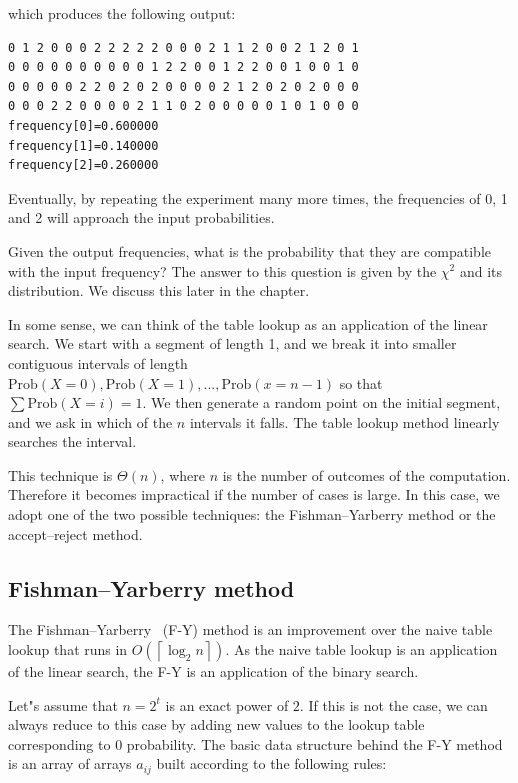 \documentclass[justified, sixbynine]{tufte-book}
\theoremstyle{plain}%
\newtheorem * {corollary}{Corollary}
\theoremstyle{definition}
\theoremstyle{remark}
\newtheorem * {remark}{Remark}
\newtheorem * {note}{Note}
\begin{document}
\begin{fullwidth}
which produces the following output:

\begin{lstlisting}
0 1 2 0 0 0 2 2 2 2 2 0 0 0 2 1 1 2 0 0 2 1 2 0 1
0 0 0 0 0 0 0 0 0 0 1 2 2 0 0 1 2 2 0 0 1 0 0 1 0
0 0 0 0 0 2 2 0 2 0 2 0 0 0 0 2 1 2 0 2 0 2 0 0 0
0 0 0 2 2 0 0 0 0 2 1 1 0 2 0 0 0 0 0 1 0 1 0 0 0
frequency[0]=0.600000
frequency[1]=0.140000
frequency[2]=0.260000
\end{lstlisting}

Eventually, by repeating the experiment many more times, the frequencies of
0, 1 and 2 will approach the input probabilities.

Given the output frequencies, what is the probability that they are compatible with the input frequency?
The answer to this question is given by the $\chi^2$ and its distribution. We discuss this later in the chapter.

In some sense, we can think of the table lookup as an application of the
linear search. We start with a segment of length 1, and we break it into smaller
contiguous intervals of length $\textrm{Prob}(X=0), \textrm{Prob}(X=1), ..., \textrm{Prob}(x=n-1)$ so that $\sum
\textrm{Prob}(X=i)=1.$ We then generate a random point on the initial segment, and we ask
in which of the $n$ intervals it falls. The table lookup method linearly
searches the interval.

This technique is $\Theta (n)$, where $n$ is the number of outcomes of the
computation. Therefore it becomes impractical if the number of cases is
large. In this case, we adopt one of the two possible techniques: the
Fishman--Yarberry method or the accept--reject method.

\goodbreak\subsection{Fishman--Yarberry method}

The Fishman--Yarberry~\cite{fishman}  (F-Y) method is an improvement over the naive table
lookup that runs in $O(\left\lceil \log _2n\right\rceil )$. As the naive
table lookup is an application of the linear search, the F-Y is an
application of the binary search.

Let"s assume that $n=2^t$ is an exact power of $2$. If this is not the case, 
we can always reduce to this case by adding new values to the lookup table
corresponding to $0$ probability. The basic data structure behind the F-Y
method is an array of arrays $a_{ij}$ built according to the following rules:


\end{fullwidth}
\end{document}
